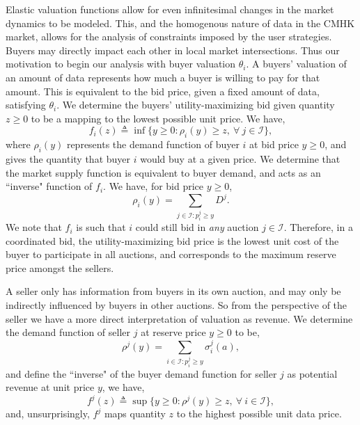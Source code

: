 \documentclass[sigconf, anonymous]{acmart}
\newcommand{\mcI}{\mathcal{I}}
\newcommand{\g}{\sigma}
\theoremstyle{definition}
\begin{document}
Elastic valuation functions allow for even infinitesimal changes in the market
dynamics to be modeled. This, and the homogenous nature of data in the CMHK market, 
allows for the analysis of constraints imposed by the user strategies. 
Buyers may directly impact each other in local market intersections.
Thus our motivation to begin our analysis with buyer valuation $\theta_i$.
A buyers' valuation of an amount of data represents how much a buyer is willing
to pay for that amount. 
This is equivalent to the bid price, given a fixed amount of data,
satisfying $\theta_i$. We determine the
buyers' utility-maximizing bid given quantity $z\ge0$ to be a mapping to the lowest
possible unit price. We have,
\begin{equation}\label{buyerinversedemand}
    f_i(z) \triangleq \inf\big\lbrace y\ge 0:
        \rho_i(y) \ge z, \ \forall \ j \in \mcI\big\rbrace,
\end{equation}
where $\rho_i(y)$ represents the demand function of buyer $i$ at bid price
$y\ge 0$, and gives the quantity that buyer $i$ would buy at a given price.
We determine that the market supply function is equivalent to buyer demand, and 
acts as an ``inverse" function of $f_i$. We have, for bid price $y\ge 0$,
\begin{equation}\label{datasupply}
    \rho_i(y) = \sum_{j\in\mcI : p_i^j\ge y} D^j.
\end{equation}
We note that $f_i$ is such that
$i$ could still bid in \emph{any} auction $j\in\mcI$.
Therefore, in a coordinated bid, the utility-maximizing bid price is the
lowest unit cost of the buyer to participate in all auctions, and corresponds to
the maximum reserve price amongst the sellers. 

A seller only has
information from buyers in its own auction, and may only be indirectly influenced by
buyers in other auctions. So from the perspective of the
seller we have a more direct interpretation of valuation as revenue.
We determine the demand function of seller $j$ at reserve price $y\ge 0$ to be,
\begin{equation}\label{datademand}
    \rho^j(y) = \sum_{i\in\mcI : p_i^j\ge y} \g_i^j(a), 
\end{equation}
and define the ``inverse" of the buyer demand function for seller $j$ as
potential revenue at unit price $y$, we have, 
\begin{equation}\label{sellerinversedemand}
    f^j(z) \triangleq \sup\big\lbrace y\ge 0:
        \rho^j(y) \ge z, \ \forall \ i \in \mcI\big\rbrace,
\end{equation}
and, unsurprisingly, $f^j$ maps quantity $z$ to the highest possible unit data
price.
\end{document}
